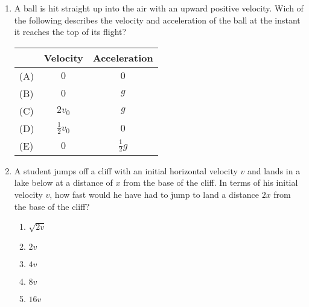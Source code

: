 \documentclass{../../../oss-apphys}
\begin{document}
\begin{multicols}{2}
\begin{enumerate}[resume,leftmargin=18pt]
  \item A ball is hit straight up into the air with an upward positive
    velocity. Wich of the following describes the velocity and acceleration
    of the ball at the instant it reaches the top of its flight?
    \begin{tabular}{lcc}
      & Velocity & Acceleration\\ \hline
      (A) & $0$ & $0$\\
      (B) & $0$ & $g$\\
      (C) & $2v_0$ & $g$\\
      (D) & $\frac{1}{2}v_0$ & $0$\\
      (E) & $0$ & $\frac{1}{2}g$
    \end{tabular}    
    
  \item A student jumps off a cliff with an initial horizontal velocity $v$ and
    lands in a lake below at a distance of $x$ from the base of the cliff. In
    terms of his initial velocity $v$, how fast would he have had to jump to
    land a distance $2x$ from the base of the cliff?
    \begin{center}
    \end{center}
    \begin{enumerate}[noitemsep,topsep=0pt,leftmargin=18pt,label=(\Alph*)]
    \item $\sqrt{2v}$
    \item $2v$
    \item $4v$
    \item $8v$
    \item $16v$
    \end{enumerate}
    

\end{enumerate}
\end{multicols}
\end{document}
